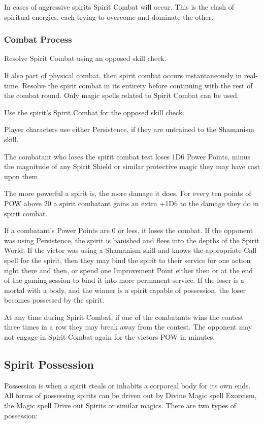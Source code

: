 In cases of aggressive spirits Spirit Combat will occur. This is the clash of spiritual energies, each trying to overcome and dominate the other.

\subsubsection{Combat Process}
\begin{rpg-list}
\item Resolve Spirit Combat using an opposed skill check.
\item If also part of physical combat, then spirit combat occurs instantaneously in real-time. Resolve the spirit combat in its entirety before continuing with the rest of the combat round. Only magic spells related to Spirit Combat can be used.
\item Use the spirit's Spirit Combat for the opposed skill check.
\item Player characters use either Persistence, if they are untrained to the Shamanism skill.
\item The combatant who loses the spirit combat test loses 1D6 Power Points, minus the magnitude of any Spirit Shield or similar protective magic they may have cast upon them.
\item The more powerful a spirit is, the more damage it does. For every ten points of POW above 20 a spirit combatant gains an extra +1D6 to the damage they do in spirit combat.
\item If a combatant’s Power Points are 0 or less, it loses the combat. If the opponent was using Persistence, the spirit is banished and flees into the depths of the Spirit World. If the victor was using a Shamanism skill and knows the appropriate Call spell for the spirit, then they may bind the spirit to their service for one action right there and then, or spend one Improvement Point either then or at the end of the gaming session to bind it into more permanent service. If the loser is a mortal with a body, and the winner is a spirit capable of possession, the loser becomes possessed by the spirit.
\item At any time during Spirit Combat, if one of the combatants wins the contest three times in a row they may break away from the contest. The opponent may not engage in Spirit Combat again for the victors POW in minutes.
\end{rpg-list}


\subsection{Spirit Possession}
Possession is when a spirit steals or inhabits a corporeal body for its own ends. All forms of possessing spirits can be driven out by Divine Magic spell Exorcism, the Magic spell Drive out Spirits or similar magics. There are two types of possession:

